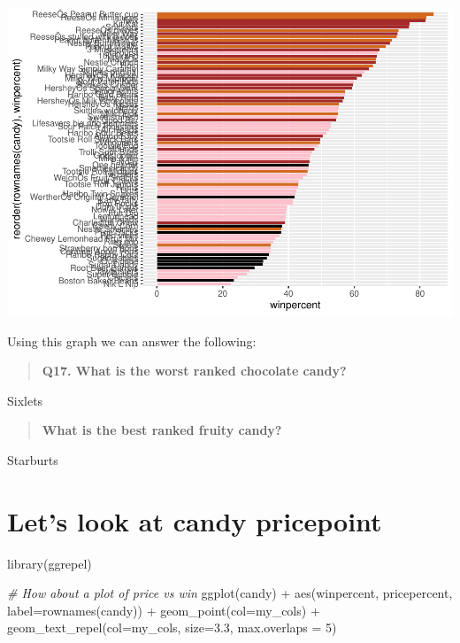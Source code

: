 \documentclass[
]{article}
\newenvironment{Shaded}{\begin{snugshade}}{\end{snugshade}}
\newcommand{\AttributeTok}[1]{\textcolor[rgb]{0.77,0.63,0.00}{#1}}
\newcommand{\CommentTok}[1]{\textcolor[rgb]{0.56,0.35,0.01}{\textit{#1}}}
\newcommand{\DecValTok}[1]{\textcolor[rgb]{0.00,0.00,0.81}{#1}}
\newcommand{\FloatTok}[1]{\textcolor[rgb]{0.00,0.00,0.81}{#1}}
\newcommand{\FunctionTok}[1]{\textcolor[rgb]{0.00,0.00,0.00}{#1}}
\newcommand{\NormalTok}[1]{#1}
\newcommand{\SpecialCharTok}[1]{\textcolor[rgb]{0.00,0.00,0.00}{#1}}
\begin{document}
\includegraphics{Class-10-Halloween-Candy_files/figure-latex/unnamed-chunk-17-1.pdf}

Using this graph we can answer the following:

\begin{quote}
\textbf{Q17. What is the worst ranked chocolate candy?}
\end{quote}

Sixlets

\begin{quote}
\textbf{What is the best ranked fruity candy?}
\end{quote}

Starburts

\hypertarget{lets-look-at-candy-pricepoint}{%
\section{Let's look at candy
pricepoint}\label{lets-look-at-candy-pricepoint}}

\begin{Shaded}
\begin{Highlighting}[]
\FunctionTok{library}\NormalTok{(ggrepel)}

\CommentTok{\# How about a plot of price vs win}
\FunctionTok{ggplot}\NormalTok{(candy) }\SpecialCharTok{+}
  \FunctionTok{aes}\NormalTok{(winpercent, pricepercent, }\AttributeTok{label=}\FunctionTok{rownames}\NormalTok{(candy)) }\SpecialCharTok{+}
  \FunctionTok{geom\_point}\NormalTok{(}\AttributeTok{col=}\NormalTok{my\_cols) }\SpecialCharTok{+} 
  \FunctionTok{geom\_text\_repel}\NormalTok{(}\AttributeTok{col=}\NormalTok{my\_cols, }\AttributeTok{size=}\FloatTok{3.3}\NormalTok{, }\AttributeTok{max.overlaps =} \DecValTok{5}\NormalTok{)}
\end{Highlighting}
\end{Shaded}
\end{document}
